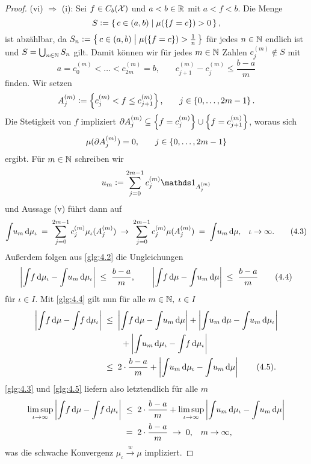 \documentclass[../main/main.tex]{subfiles}
\begin{document}
\begin{proof}
		(vi) $\Rightarrow$ (i): Sei $f \in C_b(\mathcal{X})$ und $a < b \in \mathbb{R}$ 
		mit $a < f < b$. Die Menge
		$$S \vcentcolon = \left\{\, c \in (a, b) \; \middle| \; \mu(\left\{f = c\right\}) > 0 \,\right\} \text{,}$$
		ist abzählbar, da 
		$S_n \vcentcolon = \left\{\, c \in (a, b) \; \middle| \; \mu(\left\{f = c\right\}) > \frac{1}{n} \,\right\}$ 
		für jedes $n \in \mathbb{N}$ endlich ist und $S = \bigcup_{n \in \mathbb{N}} S_n$ gilt.
		Damit können wir für jedes $m \in \mathbb{N}$ Zahlen $c_j^{(m)} \notin S$ mit
		\[a = c_0^{(m)} < \dots < c_{2m}^{(m)} = 
		b \text{,} \qquad c_{j+1}^{(m)} - c_j^{(m)} \leq \frac{b-a}{m} 
		\label{glg:4.2} \tag{4.2}\]
		finden. Wir setzen
		$$A_j^{(m)} \vcentcolon = \left\{c_j^{(m)} < f \leq c_{j+1}^{(m)}\right\}\text{,}
		\qquad j \in \left\{0,\dots,2m-1\right\} \text{.}$$ 
		Die Stetigkeit von $f$ impliziert 
		$\partial A_j^{(m)} \subseteq \left\{f = c_j^{(m)}\right\} \cup \left\{f = c_{j+1}^{(m)}\right\}$, 
		woraus sich 
		$$\mu(\partial A_j^{(m)}) = 0 \text{,} \qquad j \in \left\{0,\dots,2m-1\right\}$$
		ergibt. Für $m \in \mathbb{N}$ schreiben wir
		$$u_m \defby \sum_{j=0}^{2m-1} c_j^{(m)} \indfct_{A_j^{(m)}}$$
		und Aussage (v) führt dann auf
		\[\int_{} \, u_m \, \mathrm{d}\mu_\iota \; = \; \sum_{j=0}^{2m-1} c_j^{(m)} \mu_\iota(A_j^{(m)}) 
		\; \to \; \sum_{j=0}^{2m-1} c_j^{(m)} \mu(A_j^{(m)}) \; = \; 
		\int_{} \, u_m \, \mathrm{d}\mu \text{,} \quad \iota \to \infty \text{.} 
		\label{glg:4.3} \tag{4.3}\]
		Außerdem folgen aus \eqref{glg:4.2} die Ungleichungen
		\[\left| \int_{} \, f \, \mathrm{d}\mu_\iota - \int_{} \, u_m \, \mathrm{d}\mu_\iota \right| \; \leq \; 
		\frac{b-a}{m} \text{,} \qquad 
		\left| \int_{} \, f \, \mathrm{d}\mu - \int_{} \, u_m \, \mathrm{d}\mu \right| \; \leq \; 
		\frac{b-a}{m} \label{glg:4.4} \tag{4.4}\]
		für $\iota \in I$.
		Mit \eqref{glg:4.4} gilt nun für alle $m \in \mathbb{N}, \; \iota \in I$
		\begin{align*}
			\left| \int_{} \, f \, \mathrm{d}\mu - \int_{} \, f \, \mathrm{d}\mu_\iota \right| \; &\leq \; 
			\left| \int_{} \, f \, \mathrm{d}\mu - \int_{} \, u_m \, \mathrm{d}\mu \right| + 
			\left| \int_{} \, u_m \, \mathrm{d}\mu - \int_{} \, u_m \, \mathrm{d}\mu_\iota \right| \\ & \qquad + 
			\left| \int_{} \, u_m \, \mathrm{d}\mu_\iota - \int_{} \, f \, \mathrm{d}\mu_\iota \right| \\
			&\leq \; 2 \cdot \frac{b-a}{m} + \left| \int_{} \, u_m \, \mathrm{d}\mu_\iota - 
			\int_{} \, u_m \, \mathrm{d}\mu \right| \label{glg:4.5} \tag{4.5}\text{.}
		\end{align*}
		\eqref{glg:4.3} und \eqref{glg:4.5} liefern also letztendlich für alle $m$
		\begin{align*}
			\limsup_{\iota \to \infty} \left| \int_{} \, f \, \mathrm{d}\mu - 
			\int_{} \, f \, \mathrm{d}\mu_\iota \right|
			\; &\leq \; 2 \cdot \frac{b-a}{m} + 
			\limsup_{\iota \to \infty} \left| \int_{} \, u_m \, \mathrm{d}\mu_\iota - 
			\int_{} \, u_m \, \mathrm{d}\mu \right| \\
			&= \; 2 \cdot \frac{b-a}{m} \; \to \; 0 \text{,} 
			\quad m \to \infty \text{,}
		\end{align*}
		was die schwache Konvergenz $\mu_\iota \xrightarrow{w} \mu$ impliziert.
	\end{proof}
\end{document}
